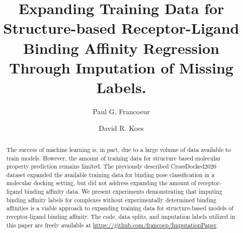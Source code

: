\documentclass[journal=jcim,manuscript=article]{achemso}
\author{Paul G. Francoeur}
\author{David R. Koes}
\affiliation[Pitt]{Department of Computational and Systems Biology, University of Pittsburgh, Pittsburgh, PA 15260}
\title[Imputation for Binding Affinity Regression]{Expanding Training Data for Structure-based Receptor-Ligand Binding Affinity Regression Through Imputation of Missing Labels.}
\begin{document}
\begin{tocentry}




\end{tocentry}

\begin{abstract}
The success of machine learning is, in part, due to a large volume of data available to train models.
However, the amount of training data for structure based molecular property prediction remains limited.
The previously described CrossDocked2020 dataset expanded the available training data for binding pose classification in a molecular docking setting, but did not address expanding the amount of receptor-ligand binding affinity data.
We present experiments demonstrating that imputing binding affinity labels for complexes without experimentally determined binding affinities is a viable approach to expanding training data for structure-based models of receptor-ligand binding affinity.
The code, data splits, and imputation labels utilized in this paper are freely available at \url{https://github.com/francoep/ImputationPaper}.
\end{abstract}
\end{document}
